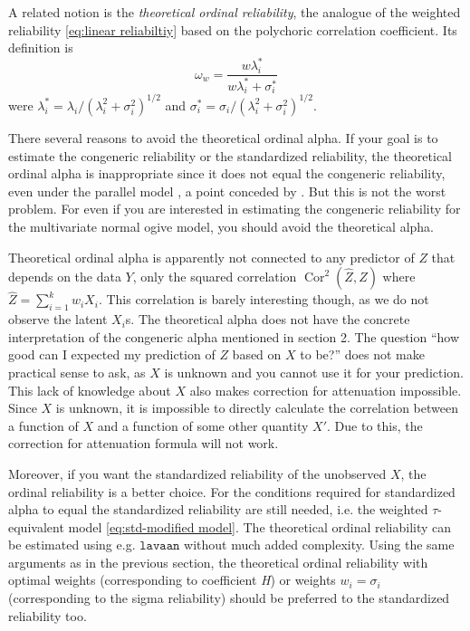 \documentclass[twoside]{article}
\DeclareMathOperator{\Cor}{Cor}
\renewcommand{\sqrt}[1]{{(#1)^{1/2}}}
\begin{document}
A related notion is the \emph{theoretical ordinal reliability}, the
analogue of the weighted reliability \eqref{eq:linear reliabiltiy} based on the polychoric
correlation coefficient. Its definition is 
\begin{equation}
\omega_{w}=\frac{w\lambda_{i}^{*}}{w\lambda_{i}^{*}+\sigma_{i}^{*}}\label{eq:ordinal omega}
\end{equation}
were $\lambda_{i}^{*}=\lambda_{i}/\sqrt{\lambda_{i}^{2}+\sigma_{i}^{2}}$
and $\sigma_{i}^{*}=\sigma_{i}/\sqrt{\lambda_{i}^{2}+\sigma_{i}^{2}}$.

There several reasons to avoid the theoretical ordinal alpha. If your
goal is to estimate the congeneric reliability or the standardized
reliability, the theoretical ordinal alpha is inappropriate since
it does not equal the congeneric reliability, even under the parallel
model \citep[p. 1062, "Misconception 2"]{Chalmers2018-fj}, a point
conceded by \citet{Zumbo2019-lm}. But this is not the worst problem.
For even if you are interested in estimating the congeneric reliability
for the multivariate normal ogive model, you should avoid the theoretical
alpha.

Theoretical ordinal alpha is apparently not connected to any predictor
of $Z$ that depends on the data $Y$, only the squared correlation $\Cor^{2}(\hat{Z},Z)$ where $\hat{Z}=\sum_{i=1}^k w_iX_i$. This correlation is barely interesting though, as we do not observe
the latent $X_{i}$s. The theoretical alpha does not have the concrete
interpretation of the congeneric alpha mentioned in section 2. The question
``how good can I expected my prediction of $Z$ based on $X$ to
be?'' does not make practical sense to ask, as $X$ is unknown and you cannot use it for your prediction. This
lack of knowledge about $X$ also makes correction for attenuation
impossible. Since $X$ is unknown, it is impossible to directly calculate
the correlation between a function of $X$ and a function of some
other quantity $X'$. Due to this, the correction for attenuation formula
will not work. 

Moreover, if you want the standardized reliability of the unobserved
$X$, the ordinal reliability is a better choice. For the conditions
required for standardized alpha to equal the standardized reliability
are still needed, i.e. the weighted $\tau$-equivalent model \eqref{eq:std-modified model}. The
theoretical ordinal reliability can be estimated using e.g. $\mathtt{lavaan}$
without much added complexity. Using the same arguments as in the
previous section, the theoretical ordinal reliability with optimal
weights (corresponding to coefficient \emph{H}) or weights $w_{i}=\sigma_{i}$
(corresponding to the sigma reliability) should be preferred to the
standardized reliability too.
\end{document}
